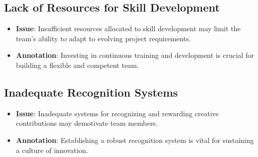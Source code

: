 \documentclass[a4paper, twoside]{article}
\begin{document}
\subsection{Lack of Resources for Skill Development}
\begin{itemize}
  \item \textbf{Issue}:  Insufficient resources allocated to skill development may limit the team's ability to adapt to evolving project requirements.
  \item \textbf{Annotation}: Investing in continuous training and development is crucial for building a flexible and competent team.\cite{Noe2010}
\end{itemize}

\subsection{Inadequate Recognition Systems}
\begin{itemize}
  \item \textbf{Issue}:  Inadequate systems for recognizing and rewarding creative contributions may demotivate team members.
  \item \textbf{Annotation}: Establishing a robust recognition system is vital for sustaining a culture of innovation.\cite{Scott1994}
\end{itemize}







\newpage
\printbibliography
\end{document}
